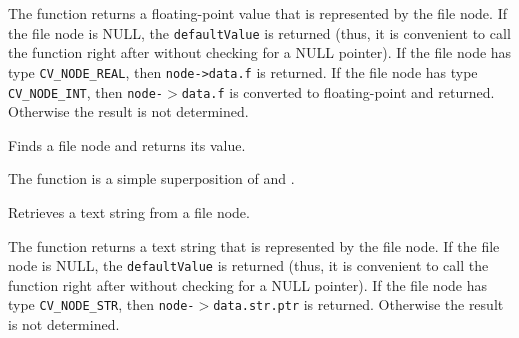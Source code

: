 
\begin{description}
\end{description}

The function returns a floating-point value
that is represented by the file node. If the file node is NULL, the
\texttt{defaultValue} is returned (thus, it is convenient to call
the function right after  without checking for a NULL
pointer). If the file node has type \texttt{CV\_NODE\_REAL},
then \texttt{node->data.f} is returned. If the file node has type
\texttt{CV\_NODE\_INT}, then \texttt{node-$>$data.f} is converted to floating-point
and returned. Otherwise the result is not determined.

Finds a file node and returns its value.


\begin{description}
\end{description}

The function is a simple superposition of  and .

Retrieves a text string from a file node.


\begin{description}
\end{description}

The function returns a text string that is represented
by the file node. If the file node is NULL, the \texttt{defaultValue}
is returned (thus, it is convenient to call the function right after
 without checking for a NULL pointer). If
the file node has type \texttt{CV\_NODE\_STR}, then \texttt{node-$>$data.str.ptr}
is returned. Otherwise the result is not determined.

